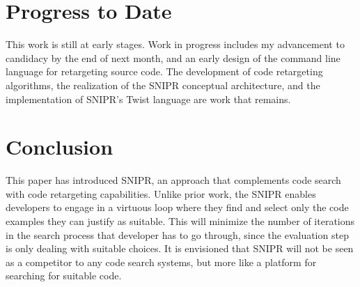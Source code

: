 \documentclass[conference]{IEEEtran}
\begin{document}
\section{Progress to Date}
\label{sec:progress}
This work is still at early stages. Work in progress includes my advancement to candidacy by the end of next month, and an early design of the command line language for retargeting source code. The development of code retargeting algorithms, the realization of the \uppercase{SnipR} conceptual architecture, and the implementation of SNIPR's Twist language are work that remains.

\section{Conclusion}
\label{sec:conclude}
This paper has introduced \uppercase{SnipR}, an approach that complements code search with code retargeting capabilities. Unlike prior work, the \uppercase{SnipR} enables developers to engage in a virtuous loop where they find and select only the code examples they can justify as suitable. This will minimize the number of iterations in the search process that developer has to go through, since the evaluation step is only dealing with suitable choices. It is envisioned that \uppercase{SnipR} will not be seen as a competitor to any code search systems, but more like a platform for searching for suitable code.




%
	
\end{document}
